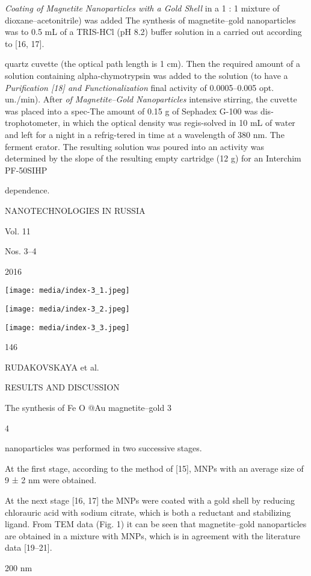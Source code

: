 \documentclass[12pt,a4paper]{article}
\begin{document}
\emph{Coating of Magnetite Nanoparticles with a Gold Shell} in a 1 : 1
mixture of dioxane--acetonitrile) was added The synthesis of
magnetite--gold nanoparticles was to 0.5 mL of a TRIS-HCl (pH 8.2)
buffer solution in a carried out according to {[}16, 17{]}.

quartz cuvette (the optical path length is 1 cm). Then the required
amount of a solution containing alpha-chymotrypsin was added to the
solution (to have a \emph{Purification {[}18{]} and Functionalization}
final activity of 0.0005--0.005 opt. un./min). After \emph{of
Magnetite--Gold Nanoparticles} intensive stirring, the cuvette was
placed into a spec-The amount of 0.15 g of Sephadex G-100 was
dis-trophotometer, in which the optical density was regis-solved in 10
mL of water and left for a night in a refrig-tered in time at a
wavelength of 380 nm. The ferment erator. The resulting solution was
poured into an activity was determined by the slope of the resulting
empty cartridge (12 g) for an Interchim PF-50SIHP

dependence.

NANOTECHNOLOGIES IN RUSSIA

Vol. 11

Nos. 3--4

2016

\texttt{[image: media/index-3\_1.jpeg]}

\texttt{[image: media/index-3\_2.jpeg]}

\texttt{[image: media/index-3\_3.jpeg]}

146

RUDAKOVSKAYA et al.

RESULTS AND DISCUSSION

The synthesis of Fe O @Au magnetite--gold 3

4

nanoparticles was performed in two successive stages.

At the first stage, according to the method of {[}15{]}, MNPs with an
average size of 9 ± 2 nm were obtained.

At the next stage {[}16, 17{]} the MNPs were coated with a gold shell by
reducing chlorauric acid with sodium citrate, which is both a reductant
and stabilizing ligand. From TEM data (Fig. 1) it can be seen that
magnetite--gold nanoparticles are obtained in a mixture with MNPs, which
is in agreement with the literature data {[}19--21{]}.

200 nm
\end{document}
